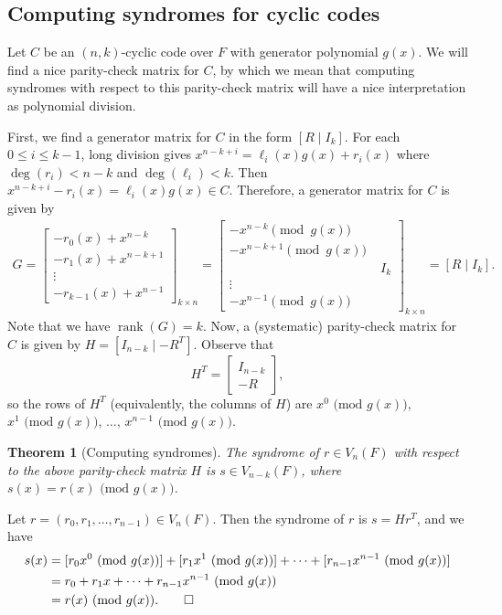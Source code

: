 \documentclass[10pt]{article}
\makeatletter
\DeclareMathOperator{\rank}{rank}
\theoremstyle{newstyle}
\newtheorem{thm}{Theorem}[subsection]
\newenvironment{pf}[1][\proofname]{\par
  \pushQED{\qed}%
  \normalfont \topsep0\p@\relax
  \trivlist
  \item[\hskip\labelsep\scshape
  #1\@addpunct{.}]\ignorespaces
}{%
  \popQED\endtrivlist\@endpefalse
}
\makeatother
\begin{document}
\subsection{Computing syndromes for cyclic codes}
Let $C$ be an $(n, k)$-cyclic code over $F$ with generator polynomial $g(x)$. 
We will find a nice parity-check matrix for $C$, by which we mean that computing syndromes 
with respect to this parity-check matrix will have a nice interpretation as polynomial division. 

First, we find a generator matrix for $C$ in the form $[R \mid I_k]$. 
For each $0 \leq i \leq k-1$, long division gives $x^{n-k+i} = \ell_i(x)g(x) + r_i(x)$ 
where $\deg(r_i) < n-k$ and $\deg(\ell_i) < k$. Then 
$x^{n-k+i} - r_i(x) = \ell_i(x) g(x) \in C$. Therefore, a generator matrix for $C$ is given by 
\begin{align*}
    G = \begin{bmatrix}
    -r_0(x) + x^{n-k} \\
    -r_1(x) + x^{n-k+1} \\
    \vdots \\
    -r_{k-1}(x) + x^{n-1}
    \end{bmatrix}_{k \times n} 
    = 
    \left[
    \begin{array}{c|c}
    -x^{n-k} \pmod{g(x)} \\
    -x^{n-k+1} \pmod{g(x)} \\
    \;&\; I_k \\[-2ex]
    \vdots \\
    -x^{n-1} \pmod{g(x)} \end{array}
    \right]_{k \times n} = [R \mid I_k]. 
\end{align*}
Note that we have $\rank(G) = k$. Now, a (systematic) parity-check matrix for $C$ is given by 
$H = [I_{n-k} \mid -R^T]$. Observe that 
\[ H^T = \left[
\begin{array}{c}
I_{n-k} \\
\hline
-R
\end{array}
\right], \]
so the rows of $H^T$ (equivalently, the columns of $H$) are $x^0 \text{ (mod $g(x)$)}$, 
$x^1 \text{ (mod $g(x)$)}$, $\dots$, $x^{n-1} \text{ (mod $g(x)$)}$. 

\begin{thm}[Computing syndromes]
The syndrome of $r \in V_n(F)$ with respect to the above parity-check matrix $H$ is 
$s \in V_{n-k}(F)$, where $s(x) = r(x) \text{ (mod $g(x)$)}$.
\end{thm}
\begin{pf}
Let $r = (r_0, r_1, \dots, r_{n-1}) \in V_n(F)$. Then the syndrome of $r$ is $s = Hr^T$, and we have 
\begin{align*}
    s(x) &= [r_0x^0 \text{ (mod $g(x)$)}] + [r_1x^1 \text{ (mod $g(x)$)}] + \cdots + [r_{n-1}x^{n-1} \text{ (mod $g(x)$)}] \\
    &= r_0 + r_1x + \cdots + r_{n-1}x^{n-1} \text{ (mod $g(x)$)} \\
    &= r(x) \text{ (mod $g(x)$)}. \qedhere 
\end{align*}
\end{pf}
\end{document}
